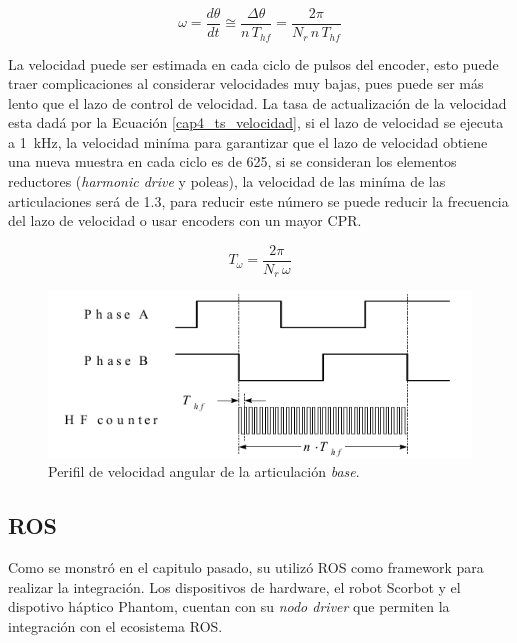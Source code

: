 \begin{equation}\label{cap4_estimacion_velocidad}
\omega = \frac{d\theta}{dt} \cong \frac{\Delta\theta}{n\,T_{hf}} =  \frac{2\pi}{N_r\,n\,T_{hf}}
\end{equation}

La velocidad puede ser estimada en cada ciclo de pulsos del encoder, esto puede traer complicaciones al considerar velocidades muy bajas, pues puede ser más lento que el lazo de control de velocidad. La tasa de actualización de la velocidad esta dadá por la Ecuación \ref{cap4_ts_velocidad}, si el lazo de velocidad se ejecuta a \SI{1}{\kilo\hertz}, la velocidad miníma para garantizar que el lazo de velocidad obtiene una nueva muestra en cada ciclo es de \SI{625}{\rpm}, si se consideran los elementos reductores (\textit{harmonic drive} y poleas), la velocidad de las miníma de las articulaciones será de \SI{1.3}{\rpm}, para reducir este número se puede reducir la frecuencia del lazo de velocidad o usar encoders con un mayor CPR.

\begin{equation}\label{cap4_ts_velocidad}
T_\omega = \frac{2\pi}{N_r\,\omega}
\end{equation}


\begin{figure}[ht]
  \centering
  \includegraphics[scale=0.6]{img/cap4/diagrama_velocidad_encoder}
  \caption{Perifil de velocidad angular de la articulación \textit{base}.}
  \label{cap4_diagrama_velocidad_encoder}
\end{figure}





\subsection{ROS}

Como se monstró en el capitulo pasado, su utilizó ROS como framework para realizar la integración. Los dispositivos de hardware, el robot Scorbot y el dispotivo háptico Phantom, cuentan con su \textit{nodo driver} que permiten la integración con el ecosistema ROS.

